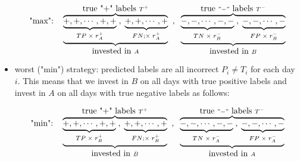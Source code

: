 \documentclass{article}
\begin{document}
\begin{itemize}[nosep]
\begin{comment}
The return $R^{\max}$ of the ideal strategy is schematically
\end{comment}
\begin{equation*}
   \hbox{"max":}  \quad \overbrace{\underbrace{\underbrace{ +,+,\cdots ,+,+}_{TP\; \times\;  r_{A}^{+}}\; , 
    \;\underbrace{+,+,\cdots, + }_{FN;\times\; r_{A}^{+}}}}_{\hbox{invested in } A}^{\hbox{true "+" labels }T^{+}}
    \;\; , \;\; 
\overbrace{\underbrace{\underbrace{-,-,\cdots  ,-,-}_{TN\; \times \; r_{B}^{-}}\; , \; 
\underbrace{ -,-,\cdots ,-}_{FP\; \times\;  r_{B}^{-}}}}_{\hbox{invested in }B}^{\hbox{true }"-"
\hbox{ labels } T^{-}} 
\end{equation*}
\begin{comment}
Therefore, for the ideal "max" strategy we have
\begin{equation}
    R^{\max} \approx T^{+}r_{A}^{+} + T^{-}r_{B}^{+}=
        (\text{TP} + \text{FN}) \, r_{A}^{+}  +
    (\text{TN} + \text{FP})\,  r_{B}^{+} 
    \label{ideal_strategy_return}
\end{equation}
\end{comment}
\item worst ("min") strategy: predicted labels are all incorrect $P_{i}\neq T_{i}$ for each day $i$. This means that we invest in $B$ on all days with true positive labels and invest in $A$ on all days with true negative labels as follows:
\begin{comment}
\begin{equation*}
    \hbox{Worst Strategy:}  \quad \overbrace{\underbrace{\underbrace{ +,+,\cdots, \cdots ,
    \cdots, +,+ }_{\hbox{true "+" labels } T^{+}} }_{\hbox{invested in } B}}^{\hbox{predicted "+" labels }P^{+}}
    \; , \; 
\overbrace{
\underbrace{\underbrace{-,-,\cdots,\cdots,\cdots,-,-}_{\hbox{true }"-"\hbox{ labels } T^{-}}}_{\hbox{invested in } A}}^{\hbox{predicted }"-"
\hbox{ labels } P^{-}} 
\end{equation*}
\end{comment}

\begin{equation*}
   \hbox{"min":}  \quad \overbrace{\underbrace{\underbrace{ +,+,\cdots ,+,+}_{TP\; \times\;  r_{B}^{+}}\; , 
    \;\underbrace{+,+,\cdots, + }_{FN;\times\; r_{B}^{+}}}}_{\hbox{invested in } B}^{\hbox{true "+" labels }T^{+}}
    \;\; , \;\; 
\overbrace{\underbrace{\underbrace{-,-,\cdots  ,-,-}_{TN\; \times \; r_{A}^{-}}\; , \; 
\underbrace{ -,-,\cdots ,-}_{FP\; \times\;  r_{A}^{-}}}}_{\hbox{invested in }A}^{\hbox{true }"-"
\hbox{ labels } T^{-}} 
\end{equation*}
\begin{comment}
Therefore, for the worst "min" strategy we have
\begin{equation}
    R^{\min} \approx T^{+}r_{B}^{+} + T^{-}r_{A}^{-}=
        (\text{TP} + \text{FN}) \, r_{A}^{+}  +
    (\text{TN} + \text{FP})\,  r_{B}^{+} 
    \label{ideal_strategy_return}
\end{equation}
\end{comment}


\end{itemize}
\end{document}
